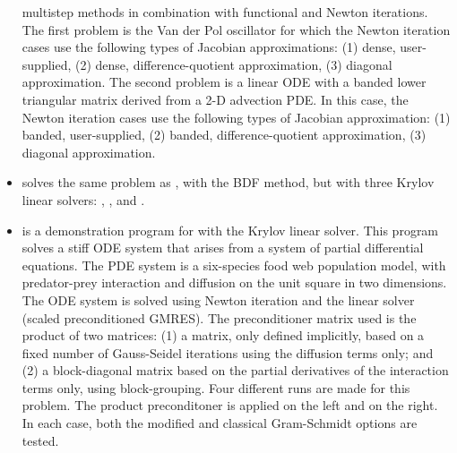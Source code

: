 \begin{itemize}
  multistep methods in combination with functional and Newton
  iterations. 
  \newline
  The first problem is the Van der Pol oscillator for which 
  the Newton iteration cases use the following types of Jacobian approximations:
  (1) dense, user-supplied, (2) dense, difference-quotient approximation, 
  (3) diagonal approximation. The second problem is a linear ODE with a
  banded lower triangular matrix derived from a 2-D advection PDE. In this
  case, the Newton iteration cases use the following types of Jacobian
  approximation: (1) banded, user-supplied, (2) banded, difference-quotient
  approximation, (3) diagonal approximation.
\item {}
  solves the same problem as , with the BDF method, but with
  three Krylov linear solvers: {\cvspgmr}, {\cvspbcg}, and {\cvsptfqmr}.
\item {}
  is a demonstration program for {\cvodes} with the Krylov linear solver.
  \newline
  This program solves a stiff ODE system that arises from a system     
  of partial differential equations.  The PDE system is a six-species
  food web population model, with predator-prey interaction and diffusion 
  on the unit square in two dimensions.
  \newline
  The ODE system is solved using Newton iteration and the      
  {\cvspgmr} linear solver (scaled preconditioned GMRES).
  \newline
  The preconditioner matrix used is the product of two matrices:         
  (1) a matrix, only defined implicitly, based on a fixed number of     
  Gauss-Seidel iterations using the diffusion terms only; and               
  (2) a block-diagonal matrix based on the partial derivatives of the   
  interaction terms only, using block-grouping.                          
  \newline
  Four different runs are made for this problem.                        
  The product preconditoner is applied on the left and on the right.    
  In each case, both the modified and classical Gram-Schmidt options    
  are tested.



\end{itemize}
